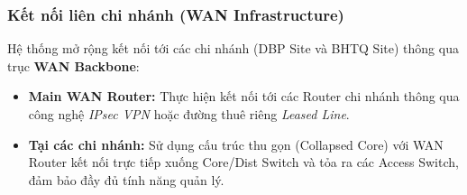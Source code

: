 \subsubsection{Kết nối liên chi nhánh (WAN Infrastructure)}
Hệ thống mở rộng kết nối tới các chi nhánh (DBP Site và BHTQ Site) thông qua trục \textbf{WAN Backbone}:
\begin{itemize}
    \item \textbf{Main WAN Router:} Thực hiện kết nối tới các Router chi nhánh thông qua công nghệ \textit{IPsec VPN} hoặc đường thuê riêng \textit{Leased Line}.
    \item \textbf{Tại các chi nhánh:} Sử dụng cấu trúc thu gọn (Collapsed Core) với WAN Router kết nối trực tiếp xuống Core/Dist Switch và tỏa ra các Access Switch, đảm bảo đầy đủ tính năng quản lý.
\end{itemize}



